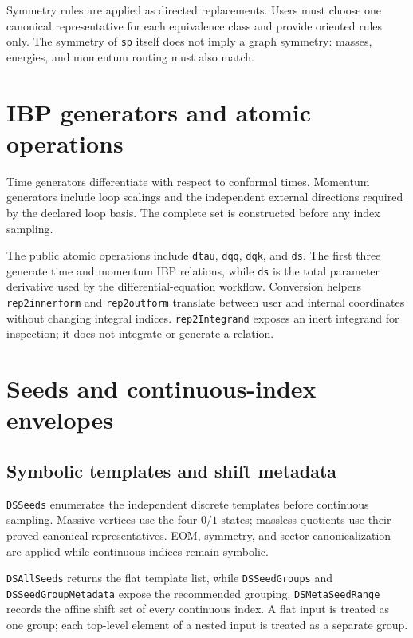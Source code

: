 ﻿\documentclass[a4paper,11pt]{article}
\begin{document}
Symmetry rules are applied as directed replacements. Users must choose one canonical
representative for each equivalence class and provide oriented rules only. The symmetry of
\texttt{sp} itself does not imply a graph symmetry: masses, energies, and momentum routing
must also match.

\section{IBP generators and atomic operations}

Time generators differentiate with respect to conformal times. Momentum generators include
loop scalings and the independent external directions required by the declared loop basis.
The complete set is constructed before any index sampling.

The public atomic operations include \texttt{dtau}, \texttt{dqq}, \texttt{dqk}, and
\texttt{ds}. The first three generate time and momentum IBP relations, while \texttt{ds}
is the total parameter derivative used by the differential-equation workflow. Conversion
helpers \texttt{rep2innerform} and \texttt{rep2outform} translate between user and internal
coordinates without changing integral indices. \texttt{rep2Integrand} exposes an inert
integrand for inspection; it does not integrate or generate a relation.

\section{Seeds and continuous-index envelopes}

\subsection{Symbolic templates and shift metadata}

\texttt{DSSeeds} enumerates the independent discrete templates before continuous sampling.
Massive vertices use the four $0/1$ states; massless quotients use their proved canonical
representatives. EOM, symmetry, and sector canonicalization are applied while continuous
indices remain symbolic.

\texttt{DSAllSeeds} returns the flat template list, while \texttt{DSSeedGroups} and
\texttt{DSSeedGroupMetadata} expose the recommended grouping. \texttt{DSMetaSeedRange}
records the affine shift set of every continuous index. A flat input is treated as one
group; each top-level element of a nested input is treated as a separate group.
\end{document}
